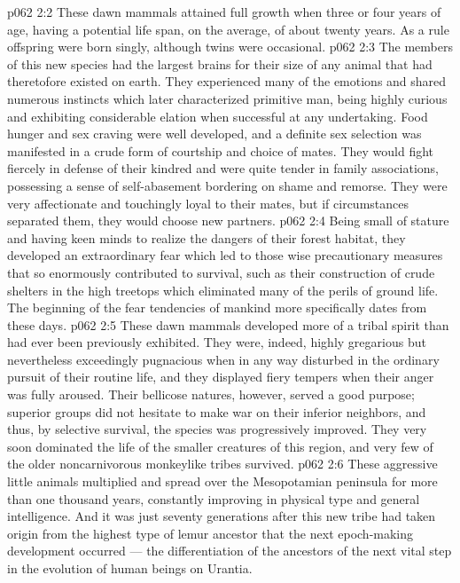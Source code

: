 \vs p062 2:2 These dawn mammals attained full growth when three or four years of age, having a potential life span, on the average, of about twenty years. As a rule offspring were born singly, although twins were occasional.
\vs p062 2:3 The members of this new species had the largest brains for their size of any animal that had theretofore existed on earth. They experienced many of the emotions and shared numerous instincts which later characterized primitive man, being highly curious and exhibiting considerable elation when successful at any undertaking. Food hunger and sex craving were well developed, and a definite sex selection was manifested in a crude form of courtship and choice of mates. They would fight fiercely in defense of their kindred and were quite tender in family associations, possessing a sense of self\hyp{}abasement bordering on shame and remorse. They were very affectionate and touchingly loyal to their mates, but if circumstances separated them, they would choose new partners.
\vs p062 2:4 Being small of stature and having keen minds to realize the dangers of their forest habitat, they developed an extraordinary fear which led to those wise precautionary measures that so enormously contributed to survival, such as their construction of crude shelters in the high treetops which eliminated many of the perils of ground life. The beginning of the fear tendencies of mankind more specifically dates from these days.
\vs p062 2:5 These dawn mammals developed more of a tribal spirit than had ever been previously exhibited. They were, indeed, highly gregarious but nevertheless exceedingly pugnacious when in any way disturbed in the ordinary pursuit of their routine life, and they displayed fiery tempers when their anger was fully aroused. Their bellicose natures, however, served a good purpose; superior groups did not hesitate to make war on their inferior neighbors, and thus, by selective survival, the species was progressively improved. They very soon dominated the life of the smaller creatures of this region, and very few of the older noncarnivorous monkeylike tribes survived.
\vs p062 2:6 These aggressive little animals multiplied and spread over the Mesopotamian peninsula for more than one thousand years, constantly improving in physical type and general intelligence. And it was just seventy generations after this new tribe had taken origin from the highest type of lemur ancestor that the next epoch\hyp{}making development occurred --- the  differentiation of the ancestors of the next vital step in the evolution of human beings on Urantia.
